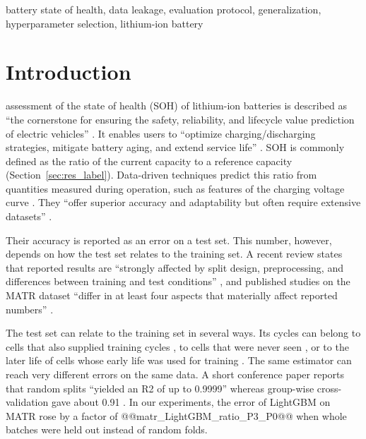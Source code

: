 \documentclass{ieeeaccess}
\begin{document}
\begin{keywords}
battery state of health, data leakage, evaluation protocol, generalization, hyperparameter selection, lithium-ion battery
\end{keywords}

\titlepgskip=-21pt

\maketitle

\section{Introduction}
\label{sec:intro}
 assessment of the state of health (SOH) of lithium-ion batteries is described as ``the cornerstone for ensuring the safety, reliability, and lifecycle value prediction of electric vehicles'' \cite{ma2026}. It enables users to ``optimize charging/discharging strategies, mitigate battery aging, and extend service life'' \cite{shan2025}. SOH is commonly defined as the ratio of the current capacity to a reference capacity (Section~\ref{sec:res_label}). Data-driven techniques predict this ratio from quantities measured during operation, such as features of the charging voltage curve \cite{aud12,aud17,aud31}. They ``offer superior accuracy and adaptability but often require extensive datasets'' \cite{gong2025}.

Their accuracy is reported as an error on a test set. This number, however, depends on how the test set relates to the training set. A recent review states that reported results are ``strongly affected by split design, preprocessing, and differences between training and test conditions'' \cite{sohail2026}, and published studies on the MATR dataset ``differ in at least four aspects that materially affect reported numbers'' \cite{aud53}.

The test set can relate to the training set in several ways. Its cycles can belong to cells that also supplied training cycles \cite{le2026,barua2026,maher2025}, to cells that were never seen \cite{le2026,barua2026}, or to the later life of cells whose early life was used for training \cite{aud12,aud17}. The same estimator can reach very different errors on the same data. A short conference paper reports that random splits ``yielded an R2 of up to 0.9999'' whereas group-wise cross-validation gave about 0.91 \cite{maher2025}. In our experiments, the error of LightGBM on MATR rose by a factor of @@matr_LightGBM_ratio_P3_P0@@ when whole batches were held out instead of random folds.
\end{document}
